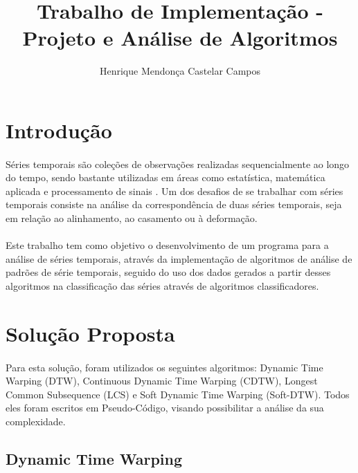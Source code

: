 \documentclass[12pt]{article}
\title{Trabalho de Implementação - Projeto e Análise de Algoritmos}
\author{Henrique Mendonça Castelar Campos\inst{1}}
\begin{document}
 

\maketitle

\section{Introdução}

\paragraph{}Séries temporais são coleções de observações realizadas sequencialmente ao longo do tempo, sendo bastante utilizadas em áreas como estatística, matemática aplicada e processamento de sinais \cite{wiki:xxx}. Um dos desafios de se trabalhar com séries temporais consiste na análise da correspondência de duas séries temporais, seja em relação ao alinhamento, ao casamento ou à deformação.\cite{trab}

\paragraph{}Este trabalho tem como objetivo o desenvolvimento de um programa para a análise de séries temporais, através da implementação de algoritmos de análise de padrões de série temporais, seguido do uso dos dados gerados a partir desses algoritmos na classificação das séries através de algoritmos classificadores.

\section{Solução Proposta}

\paragraph{}Para esta solução, foram utilizados os seguintes algoritmos: Dynamic Time Warping (DTW)\cite{sakoe1978dynamic}, Continuous Dynamic Time Warping (CDTW)\cite{munich1999continuous}, Longest Common Subsequence (LCS)\cite{vlachos2002discovering} e Soft Dynamic Time Warping (Soft-DTW)\cite{cuturi2017soft}. Todos eles foram escritos em Pseudo-Código, visando possibilitar a análise da sua complexidade.

\subsection{Dynamic Time Warping}
\end{document}
